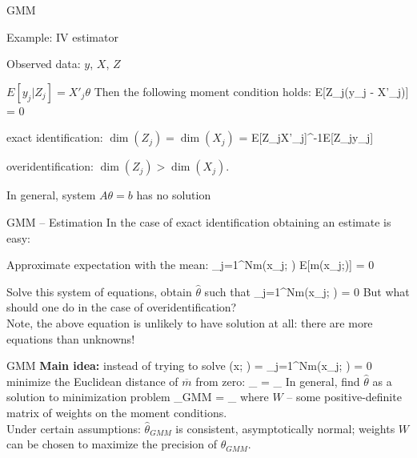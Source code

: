 \begin{frame}{GMM}
	\begin{block}{Example: IV estimator}
		\bi
			\item{Observed data: $y$, $X$, $Z$}
			\item{$E[y_j|Z_j] = X'_j\theta$}
		\ei
		Then the following moment condition holds:
		\be
			E[Z_j(y_j - X'_j\theta)] = 0
		\ee
	
		\bi
			\item{\color{red}exact identification}: $\dim(Z_j) = \dim(X_j)$
				\be
					\theta = E[Z_jX'_j]^{-1}E[Z_jy_j]
				\ee
			\item{\color{red}overidentification}: $\dim(Z_j) > \dim(X_j)$. 
			
			In general, system $A\theta = b$ has no solution
		\ei
	\end{block}
\end{frame}

\begin{frame}{GMM -- Estimation}
	In the case of {\color{red}exact identification} obtaining an estimate is easy:
	\bi
		\item{Approximate expectation with the mean:
		\be
			\sum_{j=1}^Nm(x_j; \theta) \approx E[m(x_j;\theta)] = 0
		\ee}
		\item{Solve this system of equations, obtain $\widehat{\theta}$ such that
		\be
			\sum_{j=1}^Nm(x_j; \widehat{\theta}) = 0
		\ee}
	\ei
	But what should one do in the case of {\color{red}overidentification}?\\
	Note, the above equation is unlikely to have solution at all: there are more equations than unknowns!
\end{frame}

\begin{frame}{GMM}
	\textbf{Main idea:} instead of trying to solve
	\be
		(x; \theta) = \sum_{j=1}^Nm(x_j; \theta) = 0
	\ee
	minimize the Euclidean distance of $\overline{m}$ from zero:
	\be
		\widehat{\theta}_{} = \arg\min_\theta{}
	\ee
	In general, find $\widehat{\theta}$ as a solution to minimization problem
	\be
		\widehat{\theta}_{GMM} = \arg\min_\theta{}
	\ee
	where $W$ -- some positive-definite matrix of weights on the moment conditions.\\\bigskip
	Under certain assumptions: $\widehat{\theta}_{GMM}$ is consistent, asymptotically normal; weights $W$ can be chosen to maximize the precision of $\widehat{\theta}_{GMM}$.
\end{frame}

